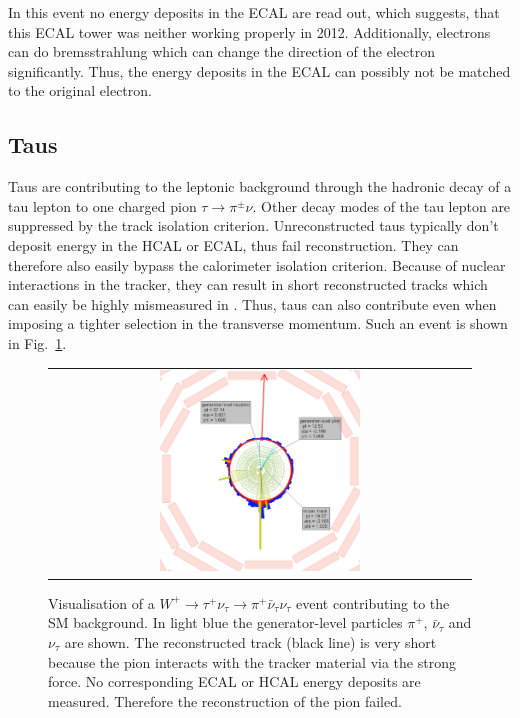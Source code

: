 In this event no energy deposits in the ECAL are read out, which suggests, that this ECAL tower was neither working properly in 2012.
Additionally, electrons can do bremsstrahlung which can change the direction of the electron significantly.
Thus, the energy deposits in the ECAL can possibly not be matched to the original electron.

\subsection*{Taus}
Taus are contributing to the leptonic background through the hadronic decay of a tau lepton to one charged pion $\tau\rightarrow\pi^{\pm}\nu$.
Other decay modes of the tau lepton are suppressed by the track isolation criterion.
Unreconstructed taus typically don't deposit energy in the HCAL or ECAL, thus fail reconstruction.
They can therefore also easily bypass the calorimeter isolation criterion.
Because of nuclear interactions in the tracker, they can result in short reconstructed tracks which can easily be highly mismeasured in \pt.
Thus, taus can also contribute even when imposing a tighter selection in the transverse momentum.
Such an event is shown in Fig.~\ref{fig:LostTau}.  
\begin{figure}[!tb]
  \centering 
  \begin{tabular}{c}
    \includegraphics[width=0.49\textwidth]{figures/analysis/LostTau_Lumi_60133_Event_24033837.png}
  \end{tabular}
  \caption{Visualisation of a $W^{+}\rightarrow \tau^{+}\nu_{\tau} \rightarrow \pi^{+}\bar{\nu}_{\tau} \nu_{\tau} $ event contributing to the SM background. 
           In light blue the generator-level particles $\pi^{+}$, $\bar{\nu}_{\tau}$ and $\nu_{\tau}$ are shown.
           The reconstructed track (black line) is very short because the pion interacts with the tracker material via the strong force.
           No corresponding ECAL or HCAL energy deposits are measured. Therefore the reconstruction of the pion failed.}
  \label{fig:LostTau}
\end{figure}

